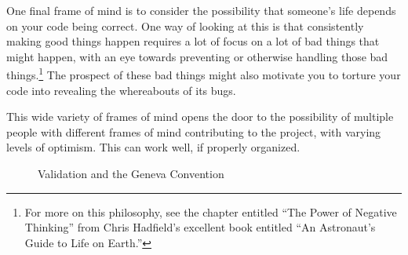 One final frame of mind is to consider the possibility that someone's
life depends on your code being correct.
One way of looking at this is that consistently making good things happen
requires a lot of focus on a lot of bad things that might happen, with
an eye towards preventing or otherwise handling those bad things.\footnote{
	For more on this philosophy, see the chapter entitled
	``The Power of Negative Thinking''
	from Chris Hadfield's excellent book entitled
	``An Astronaut's Guide to Life on Earth.''}
The prospect of these bad things might also motivate you to torture your
code into revealing the whereabouts of its bugs.

This wide variety of frames of mind opens the door to
the possibility of multiple people with different frames of
mind contributing to the project, with varying levels of optimism.
This can work well, if properly organized.

\begin{figure}[tb]
\centering
{}
\caption{Validation and the Geneva Convention}
\end{figure}

